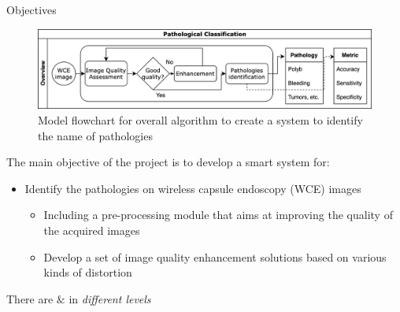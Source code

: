 \documentclass{libs/ufc_format}
\begin{document}
\begin{frame}{Objectives}
    \begin{figure}
        \includegraphics[scale=0.2]{libs/overallalgo.drawio.png}
        \caption{Model flowchart for overall algorithm to create a system to identify the name of pathologies}
        \label{fig:overallalgo}
    \end{figure}
    The main objective of the project is to develop a smart system for:
    \begin{itemize}
        \item Identify the pathologies on wireless capsule endoscopy (WCE) images
              \begin{itemize}
                  \item Including a pre-processing module that aims at improving the quality of the acquired images
                  \item Develop a set of image quality enhancement solutions based on various kinds of distortion
              \end{itemize}


    \end{itemize}


    There are  $\&$ in \emph{different levels}
\end{frame}
\end{document}
